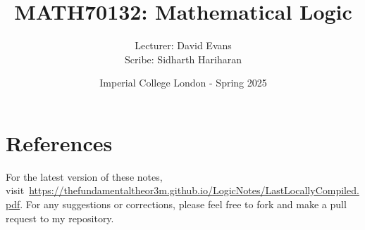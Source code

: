 \documentclass[a4paper, 12pt, openany, oneside]{book}
\title{\vspace{-2em}MATH70132: Mathematical Logic}
\author{Lecturer: David Evans \\ Scribe: Sidharth Hariharan}
\date{Imperial College London - Spring 2025}
\begin{document}
\setlength{\abovedisplayskip}{7.5pt}  %
\setlength{\belowdisplayskip}{7.5pt}  %
\setlength{\abovedisplayshortskip}{2pt}
\setlength{\belowdisplayshortskip}{2pt}

\maketitle
\thispagestyle{empty}

\tableofcontents
\thispagestyle{empty}

\newpage

\nocite{*}



% 
% 



\newpage

\chapter*{References}
\thispagestyle{empty}


\printbibliography[prenote=mybibnote]

For the latest version of these notes, visit~\url{https://thefundamentaltheor3m.github.io/LogicNotes/LastLocallyCompiled.pdf}. For any suggestions or corrections, please feel free to fork and make a pull request to my repository.
\end{document}

